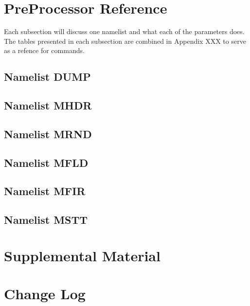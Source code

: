 \documentclass[12pt,twoside]{book}
\begin{document}
\chapter{PreProcessor Reference}
\label{preprocessor_reference}
Each subsection will discuss one namelist and what each of the parameters does. The tables presented in each subsection are combined in Appendix XXX  to serve as a refence for commands.

\section{Namelist DUMP}

\section{Namelist MHDR}

\section{Namelist MRND}

\section{Namelist MFLD}

\section{Namelist MFIR}

\section {Namelist MSTT}
\chapter{Supplemental Material}

\chapter{Change Log}

\label{last_page}
\end{document}
